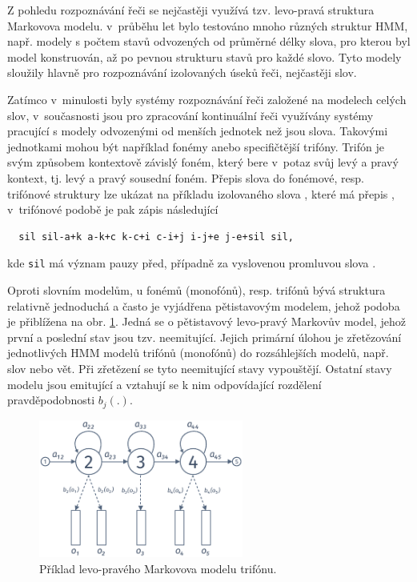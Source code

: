 Z pohledu rozpoznávání řeči se nejčastěji využívá tzv. levo-pravá struktura Markovova modelu. v~průběhu let bylo testováno mnoho různých struktur HMM, např. modely s počtem stavů odvozených od průměrné délky slova, pro kterou byl model konstruován, až po pevnou strukturu stavů pro každé slovo. Tyto modely sloužily hlavně pro rozpoznávání izolovaných úseků řeči, nejčastěji slov.

Zatímco v~minulosti byly systémy rozpoznávání řeči založené na modelech celých slov, v~současnosti jsou pro zpracování kontinuální řeči využívány systémy pracující s modely odvozenými od menších jednotek než jsou slova.
Takovými jednotkami mohou být například fonémy anebo specifičtější trifóny. Trifón je svým způsobem kontextově závislý foném, který bere v~potaz svůj levý a pravý kontext, tj. levý a pravý sousední foném. Přepis slova do fonémové, resp. trifónové struktury lze ukázat na příkladu izolovaného slova , které má přepis , v~trifónové podobě je pak zápis následující

\begin{verbatim}
  sil sil-a+k a-k+c k-c+i c-i+j i-j+e j-e+sil sil,
\end{verbatim}

\noindent kde \texttt{sil} má význam pauzy před, případně za vyslovenou promluvou slova .

Oproti slovním modelům, u fonémů (monofónů), resp. trifónů bývá struktura relativně jednoduchá a často je vyjádřena pětistavovým modelem, jehož podoba je přiblížena na obr. \ref{fig:asr:acoustic:hmm}. Jedná se o pětistavový levo-pravý Markovův model, jehož první a poslední stav jsou tzv. neemitující. Jejich primární úlohou je zřetězování jednotlivých HMM modelů trifónů (monofónů) do rozsáhlejších modelů, např. slov nebo vět. Při zřetězení se tyto neemitující stavy vypouštějí. Ostatní stavy modelu jsou emitující a vztahují se k nim odpovídající rozdělení pravděpodobnosti $b_j(.)$.

\begin{figure}[hbpt]
  \centering
  \includegraphics[width=0.6\textwidth]{./ch4-asr/img/hmm_structure.pdf}
  \caption{Příklad levo-pravého Markovova modelu trifónu.}
  \label{fig:asr:acoustic:hmm}
\end{figure}

